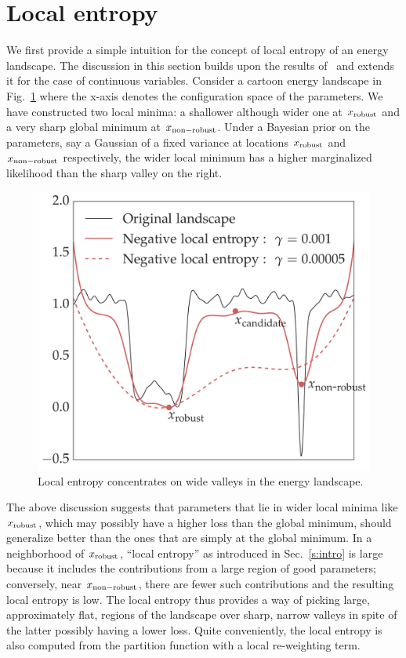 \documentclass[10pt]{article}
\newcommand{\pc}[2]{{\color{ForestGreen}#1}\marginpar{\tiny\noindent{\raggedright{\color{Sienna}[PC]}\color{Sienna}{#2} \par}}}
\begin{document}
\section{Local entropy}
\label{s:local_entropy}

We first provide a simple intuition for the concept of local entropy of an energy landscape. \pc{The discussion in this section builds upon the results of~\citet{baldassi2016unreasonable} and extends it for the case of continuous variables.}{} Consider a cartoon energy landscape in Fig.~\ref{fig:entropyfig} where the x-axis denotes the configuration space of the parameters. We have constructed two local minima: a shallower although wider one at $x_{\mathrm{robust}}$ and a very sharp global minimum at $x_{\mathrm{non-robust}}$. Under a Bayesian prior on the parameters, say a Gaussian of a fixed variance at locations $x_{\mathrm{robust}}$ and $x_{\mathrm{non-robust}}$ respectively, the wider local minimum has a higher marginalized likelihood than the sharp valley on the right.

\begin{figure}
\centering
\includegraphics[width=0.4 \textwidth]{entropyfig.pdf}
\caption{\small Local entropy concentrates on wide valleys in the energy landscape.}
\label{fig:entropyfig}
\vspace*{-0.1in}
\end{figure}

The above discussion suggests that parameters that lie in wider local minima like $x_{\mathrm{robust}}$, which may possibly have a higher loss than the global minimum, should generalize better than the ones that are simply at the global minimum. In a neighborhood of $x_{\mathrm{robust}}$, ``local entropy'' as introduced in Sec.~\ref{s:intro} is large because it includes the contributions from a large region of good parameters; conversely, near $x_{\mathrm{non-robust}}$, there are fewer such contributions and the resulting local entropy is low. The local entropy thus provides a way of picking large, approximately flat, regions of the landscape over sharp, narrow valleys in spite of the latter possibly having a lower loss. Quite conveniently, the local entropy is also computed from the partition function with a local re-weighting term.
\end{document}
